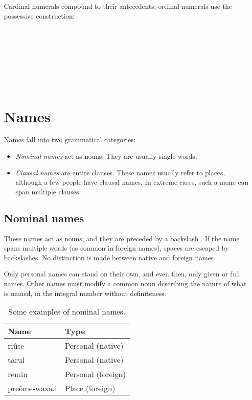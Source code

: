 \documentclass{book}
\begin{document}
Cardinal numerals compound to their antecedents; ordinal numerals use the possessive  construction: \\
~\\
 \\
 \\
  \\
~\\
 \\
   \\
 

\chapter{Names}

Names fall into two grammatical categories:

\begin{itemize}
    \item \emph{Nominal names} act as nouns. They are usually single words.
    \item \emph{Clausal names} are entire clauses. These names usually refer to places, although a few people have clausal names. In extreme cases, such a name can span multiple clauses.
\end{itemize}

\section{Nominal names}

These names act as nouns, and they are preceded by a backslash \hortho{\bs}. If the name spans multiple words (as common in foreign names), spaces are escaped by backslashes. No distinction is made between native and foreign names.

Only personal names can stand on their own, and even then, only given or full names. Other names must modify a common noun describing the nature of what is named, in the integral number without definiteness.

\begin{table}[h]
    \centering
    \caption{Some examples of nominal names.}
    \label{table:names1}
    \begin{tabular}{|>{\kardinal}l|l|}
        \hline
        \textnormal{Name} & Type \\
        \hline
        \bs{}ri\^use & Personal (native) \\
        \bs{}tarul & Personal (native) \\
        \bs{}remin & Personal (foreign) \\
        pre\^ome-\bs{}waxa.i & Place (foreign) \\
        \hline
    \end{tabular}
\end{table}
\end{document}
